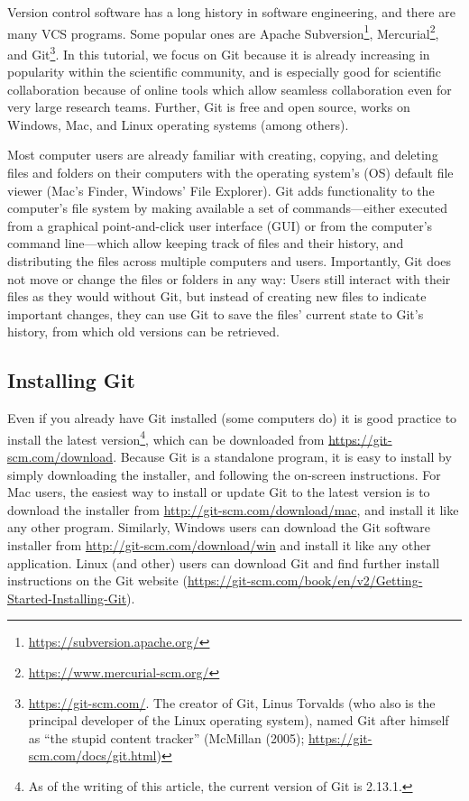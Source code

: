 \documentclass[
  american,
  ,doc,floatsintext]{apa6}
\begin{document}
Version control software has a long history in software engineering, and there are many VCS programs. Some popular ones are Apache Subversion\footnote{\url{https://subversion.apache.org/}}, Mercurial\footnote{\url{https://www.mercurial-scm.org/}}, and Git\footnote{\url{https://git-scm.com/}. The creator of Git, Linus Torvalds (who also is the principal developer of the Linux operating system), named Git after himself as \enquote{the stupid content tracker} (McMillan (2005); \url{https://git-scm.com/docs/git.html})}. In this tutorial, we focus on Git because it is already increasing in popularity within the scientific community, and is especially good for scientific collaboration because of online tools which allow seamless collaboration even for very large research teams. Further, Git is free and open source, works on Windows, Mac, and Linux operating systems (among others).

Most computer users are already familiar with creating, copying, and deleting files and folders on their computers with the operating system's (OS) default file viewer (Mac's Finder, Windows' File Explorer). Git adds functionality to the computer's file system by making available a set of commands---either executed from a graphical point-and-click user interface (GUI) or from the computer's command line---which allow keeping track of files and their history, and distributing the files across multiple computers and users. Importantly, Git does not move or change the files or folders in any way: Users still interact with their files as they would without Git, but instead of creating new files to indicate important changes, they can use Git to save the files' current state to Git's history, from which old versions can be retrieved.

\hypertarget{installing-git}{%
\subsection{Installing Git}\label{installing-git}}

Even if you already have Git installed (some computers do) it is good practice to install the latest version\footnote{As of the writing of this article, the current version of Git is 2.13.1.}, which can be downloaded from \url{https://git-scm.com/download}. Because Git is a standalone program, it is easy to install by simply downloading the installer, and following the on-screen instructions. For Mac users, the easiest way to install or update Git to the latest version is to download the installer from \url{http://git-scm.com/download/mac}, and install it like any other program. Similarly, Windows users can download the Git software installer from \url{http://git-scm.com/download/win} and install it like any other application. Linux (and other) users can download Git and find further install instructions on the Git website (\url{https://git-scm.com/book/en/v2/Getting-Started-Installing-Git}).
\end{document}
